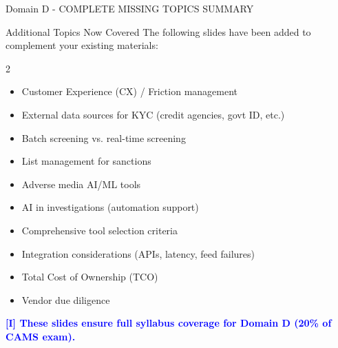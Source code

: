 \documentclass[11pt,a4paper]{beamer}
\newcommand{\bluenote}[1]{\textcolor{blue}{\textbf{[I] #1}}}
\begin{document}
\begin{frame}{Domain D - COMPLETE MISSING TOPICS SUMMARY}
	\begin{block}{Additional Topics Now Covered}
		The following slides have been added to complement your existing materials:
	\end{block}
	\begin{multicols}{2}
		\begin{itemize}
			\item Customer Experience (CX) / Friction management
			\item External data sources for KYC (credit agencies, govt ID, etc.)
			\item Batch screening vs. real-time screening
			\item List management for sanctions
			\item Adverse media AI/ML tools
			\item AI in investigations (automation support)
			\item Comprehensive tool selection criteria
			\item Integration considerations (APIs, latency, feed failures)
			\item Total Cost of Ownership (TCO)
			\item Vendor due diligence
		\end{itemize}
	\end{multicols}
	\vspace{0.3cm}
	\bluenote{These slides ensure full syllabus coverage for Domain D (20\% of CAMS exam).}
\end{frame}
\end{document}
